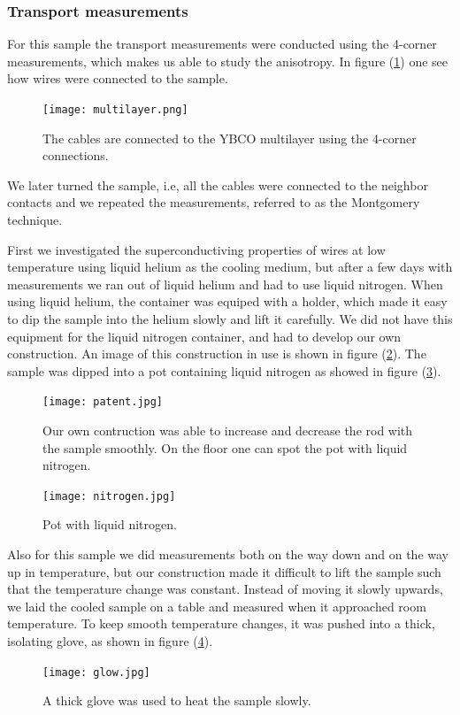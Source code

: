 \documentclass{comjnl}
\begin{document}
\subsubsection{Transport measurements}
For this sample the transport measurements were conducted using the 4-corner measurements, which makes us able to study the anisotropy. In figure (\ref{fig:multilayer}) one see how wires were connected to the sample.
\begin{figure}[h]
\centering
\texttt{[image: multilayer.png]}
\caption{The cables are connected to the YBCO multilayer using the 4-corner connections. \label{fig:multilayer}}
\end{figure}
We later turned the sample, i.e, all the cables were connected to the neighbor contacts and we repeated the measurements, referred to as the Montgomery technique. 

First we investigated the superconductiving properties of wires at low temperature using liquid helium as the cooling medium, but after a few days with measurements we ran out of liquid helium and had to use liquid nitrogen. When using liquid helium, the container was equiped with a holder, which made it easy to dip the sample into the helium slowly and lift it carefully. We did not have this equipment for the liquid nitrogen container, and had to develop our own construction. An image of this construction in use is shown in figure (\ref{fig:patent}). The sample was dipped into a pot containing liquid nitrogen as showed in figure (\ref{fig:nitrogen}). 
\begin{figure}[h]
\centering
\texttt{[image: patent.jpg]}
\caption{Our own contruction was able to increase and decrease the rod with the sample smoothly. On the floor one can spot the pot with liquid nitrogen. \label{fig:patent}}
\end{figure}
\begin{figure}[h]
\centering
\texttt{[image: nitrogen.jpg]}
\caption{Pot with liquid nitrogen. \label{fig:nitrogen}}
\end{figure}
Also for this sample we did measurements both on the way down and on the way up in temperature, but our construction made it difficult to lift the sample such that the temperature change was constant. Instead of moving it slowly upwards, we laid the cooled sample on a table and measured when it approached room temperature. To keep smooth temperature changes, it was pushed into a thick, isolating glove, as shown in figure (\ref{fig:glove}).
\begin{figure}[h]
\centering
\texttt{[image: glow.jpg]}
\caption{A thick glove was used to heat the sample slowly. \label{fig:glove}}
\end{figure}
\end{document}
